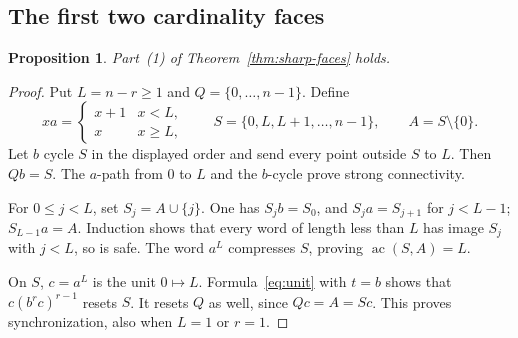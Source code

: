 \documentclass[11pt]{article}
\theoremstyle{definition}
\theoremstyle{plain}
\newtheorem{proposition}[theorem]{Proposition}
\newcommand{\ac}{\operatorname{ac}}
\begin{document}
\subsection{The first two cardinality faces}
\begin{proposition}\label{prop:one}
Part~(1) of Theorem~\ref{thm:sharp-faces} holds.
\end{proposition}
\begin{proof}
Put $L=n-r\ge1$ and $Q=\{0,\ldots,n-1\}$. Define
\[
 xa=\begin{cases}x+1&x<L,\\x&x\ge L,\end{cases}
 \qquad S=\{0,L,L+1,\ldots,n-1\},\qquad A=S\setminus\{0\}.
\]
Let $b$ cycle $S$ in the displayed order and send every point outside $S$ to $L$. Then $Qb=S$. The $a$-path from $0$ to $L$ and the $b$-cycle prove strong connectivity.

For $0\le j<L$, set $S_j=A\cup\{j\}$. One has $S_jb=S_0$, and $S_ja=S_{j+1}$ for $j<L-1$; $S_{L-1}a=A$. Induction shows that every word of length less than $L$ has image $S_j$ with $j<L$, so is safe. The word $a^L$ compresses $S$, proving $\ac(S,A)=L$.

On $S$, $c=a^L$ is the unit $0\mapsto L$. Formula~\eqref{eq:unit} with $t=b$ shows that $c(b^rc)^{r-1}$ resets $S$. It resets $Q$ as well, since $Qc=A=Sc$. This proves synchronization, also when $L=1$ or $r=1$.
\end{proof}
\end{document}
